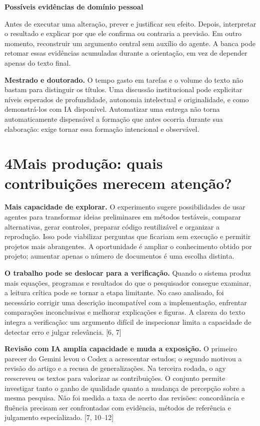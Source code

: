 \documentclass[11pt,a4paper]{article}
\newcommand{\fonte}[1]{{\small\color{navy}[#1]}}
\newcommand{\titulo}[2]{\section*{\color{navy}#1\quad #2}}
\begin{document}
\begin{destaque}
\textbf{Possíveis evidências de domínio pessoal}\par
Antes de executar uma alteração, prever e justificar seu efeito. Depois, interpretar o resultado e explicar por que ele confirma ou contraria a previsão. Em outro momento, reconstruir um argumento central sem auxílio do agente. A banca pode retomar essas evidências acumuladas durante a orientação, em vez de depender apenas do texto final.
\end{destaque}

\textbf{Mestrado e doutorado.} O tempo gasto em tarefas e o volume do texto não bastam para distinguir os títulos. Uma discussão institucional pode explicitar níveis esperados de profundidade, autonomia intelectual e originalidade, e como demonstrá-los com IA disponível. Automatizar uma entrega não torna automaticamente dispensável a formação que antes ocorria durante sua elaboração: exige tornar essa formação intencional e observável.
\newpage

\titulo{4}{Mais produção: quais contribuições merecem atenção?}
\textbf{Mais capacidade de explorar.} O experimento sugere possibilidades de usar agentes para transformar ideias preliminares em métodos testáveis, comparar alternativas, gerar controles, preparar código reutilizável e organizar a reprodução. Isso pode viabilizar perguntas que ficariam sem execução e permitir projetos mais abrangentes. A oportunidade é ampliar o conhecimento obtido por projeto; aumentar apenas o número de documentos é uma escolha distinta.

\textbf{O trabalho pode se deslocar para a verificação.} Quando o sistema produz mais equações, programas e resultados do que o pesquisador consegue examinar, a leitura crítica pode se tornar a etapa limitante. No caso analisado, foi necessário corrigir uma descrição incompatível com a implementação, enfrentar comparações inconclusivas e melhorar explicações e figuras. A clareza do texto integra a verificação: um argumento difícil de inspecionar limita a capacidade de detectar erro e julgar relevância. \fonte{6, 7}

\textbf{Revisão com IA amplia capacidade e muda a exposição.} O primeiro parecer do Gemini levou o Codex a acrescentar estudos; o segundo motivou a revisão do artigo e a recusa de generalizações. Na terceira rodada, o agy reescreveu os textos para valorizar as contribuições. O conjunto permite investigar tanto o ganho de qualidade quanto a mudança de percepção sobre a mesma pesquisa. Não foi medida a taxa de acerto das revisões: concordância e fluência precisam ser confrontadas com evidência, métodos de referência e julgamento especializado. \fonte{7, 10--12}
\end{document}
